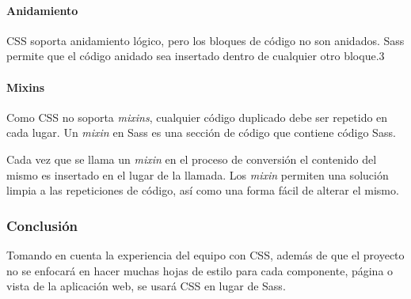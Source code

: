 \paragraph*{Anidamiento}
CSS soporta anidamiento lógico, pero los bloques de código no son anidados. Sass permite que el código anidado sea insertado dentro de cualquier otro bloque.3


\paragraph*{Mixins}

Como CSS no soporta \textit{mixins}, cualquier código duplicado debe ser repetido en cada lugar. Un \textit{mixin} en Sass es una sección de código que contiene código Sass. 


Cada vez que se llama un \textit{mixin} en el proceso de conversión el contenido del mismo es insertado en el lugar de la llamada. Los \textit{mixin} permiten una solución limpia a las repeticiones de código, así como una forma fácil de alterar el mismo.



\subsubsection*{Conclusión}

Tomando en cuenta la experiencia del equipo con CSS, además de que el proyecto no se enfocará en hacer muchas hojas de estilo para cada componente, página o vista de la aplicación web, se usará CSS en lugar de Sass.